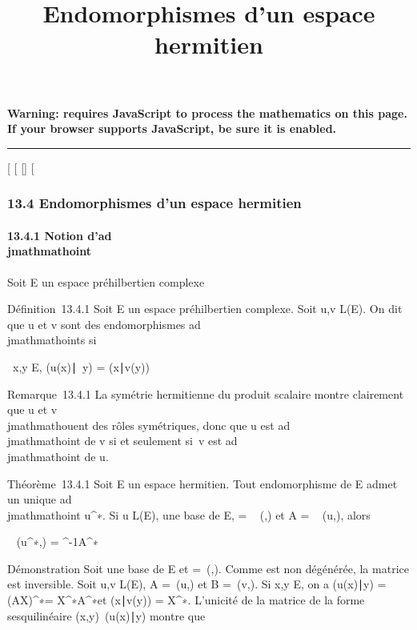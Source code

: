 \documentclass[]{article}
\title{Endomorphismes d'un espace hermitien}
\author{}
\date{}
\begin{document}
\maketitle

\textbf{Warning: 
requires JavaScript to process the mathematics on this page.\\ If your
browser supports JavaScript, be sure it is enabled.}

\begin{center}\rule{3in}{0.4pt}\end{center}

{[}
{[}
{[}{]}
{[}

\subsubsection{13.4 Endomorphismes d'un espace hermitien}

\paragraph{13.4.1 Notion d'ad\\jmathmathoint}

Soit E un espace préhilbertien complexe

Définition~13.4.1 Soit E un espace préhilbertien complexe. Soit u,v \in
L(E). On dit que u et v sont des endomorphismes ad\\jmathmathoints si

\forall~x,y \in E, (u(x)\mathrel∣~y)
= (x∣v(y))

Remarque~13.4.1 La symétrie hermitienne du produit scalaire montre
clairement que u et v \\jmathmathouent des rôles symétriques, donc que u est
ad\\jmathmathoint de v si et seulement si~v est ad\\jmathmathoint de u.

Théorème~13.4.1 Soit E un espace hermitien. Tout endomorphisme de E
admet un unique ad\\jmathmathoint u^∗. Si u \in L(E),  une base de E, \Omega
= \mathrmMat~ (\phi,) et A
= \mathrmMat~ (u,), alors

\mathrmMat~
(u^∗,) = \Omega^-1A^∗\Omega

Démonstration Soit  une base de E et \Omega =\
\mathrmMat (\phi,). Comme \phi est non dégénérée, la
matrice \Omega est inversible. Soit u,v \in L(E), A =\
\mathrmMat (u,) et B =\
\mathrmMat (v,). Si x,y \in E, on a
(u(x)∣y) = (AX)^∗\OmegaY =
X^∗A^∗\OmegaY et (x∣v(y)) =
X^∗\OmegaBY . L'unicité de la matrice de la forme sesquilinéaire
(x,y)\mapsto~(u(x)\mathrel∣y)
montre que
\end{document}
